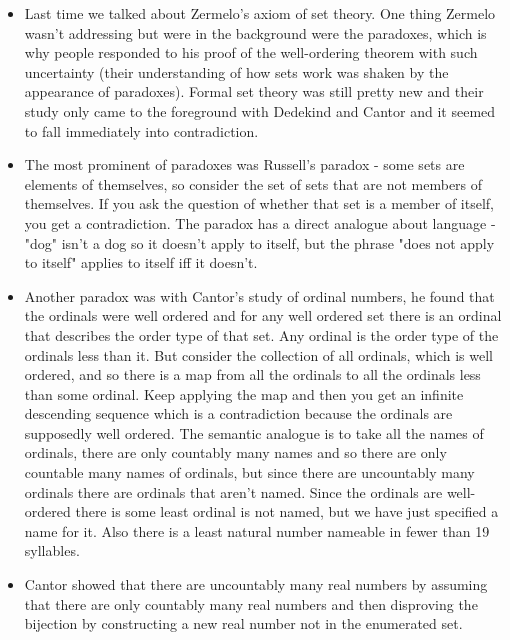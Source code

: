 \documentclass[12pt]{article}
\theoremstyle{definition}
\begin{document}
\begin{itemize}
    \itemsep0em 
    \item
        Last time we talked about Zermelo's axiom of set theory. One thing
        Zermelo wasn't addressing but were in the background were the
        paradoxes, which is why people responded to his proof of the
        well-ordering theorem with such uncertainty (their understanding of how
        sets work was shaken by the appearance of paradoxes). Formal set theory
        was still pretty new and their study only came to the foreground with
        Dedekind and Cantor and it seemed to fall immediately into
        contradiction.
    \item
        The most prominent of paradoxes was Russell's paradox - some sets are
        elements of themselves, so consider the set of sets that are not
        members of themselves. If you ask the question of whether that set is a
        member of itself, you get a contradiction. The paradox has a direct
        analogue about language - "dog" isn't a dog so it doesn't apply to
        itself, but the phrase "does not apply to itself" applies to itself iff
        it doesn't.
    \item
        Another paradox was with Cantor's study of ordinal numbers, he found
        that the ordinals were well ordered and for any well ordered set there
        is an ordinal that describes the order type of that set. Any ordinal is
        the order type of the ordinals less than it. But consider the
        collection of all ordinals, which is well ordered, and so there is a
        map from all the ordinals to all the ordinals less than some ordinal.
        Keep applying the map and then you get an infinite descending sequence
        which is a contradiction because the ordinals are supposedly well
        ordered. The semantic analogue is to take all the names of ordinals,
        there are only countably many names and so there are only countable
        many names of ordinals, but since there are uncountably many ordinals
        there are ordinals that aren't named. Since the ordinals are
        well-ordered there is some least ordinal is not named, but we have just
        specified a name for it. Also there is a least natural number nameable
        in fewer than 19 syllables. 
    \item
        Cantor showed that there are uncountably many real numbers by assuming
        that there are only countably many real numbers and then disproving the
        bijection by constructing a new real number not in the enumerated set.

\end{itemize}
\end{document}
